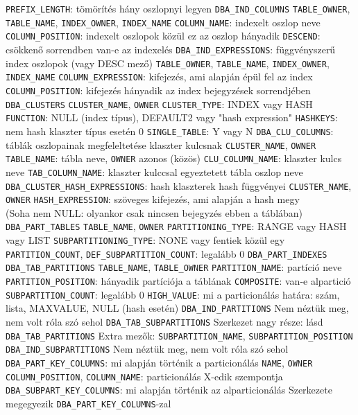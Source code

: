 \documentclass[12pt,a4paper]{article}
\begin{document}
\begin{outline}
		\2 \texttt{PREFIX\_LENGTH}: tömörítés hány oszlopnyi legyen
	\1 \texttt{DBA\_IND\_COLUMNS}
		\2 \texttt{TABLE\_OWNER}, \texttt{TABLE\_NAME}, \texttt{INDEX\_OWNER}, \texttt{INDEX\_NAME}
		\2 \texttt{COLUMN\_NAME}: indexelt oszlop neve
		\2 \texttt{COLUMN\_POSITION}: indexelt oszlopok közül ez az oszlop hányadik
		\2 \texttt{DESCEND}: csökkenő sorrendben van-e az indexelés
	\1 \texttt{DBA\_IND\_EXPRESSIONS}: függvényszerű index oszlopok (vagy DESC mező)
		\2 \texttt{TABLE\_OWNER}, \texttt{TABLE\_NAME}, \texttt{INDEX\_OWNER}, \texttt{INDEX\_NAME}
		\2 \texttt{COLUMN\_EXPRESSION}: kifejezés, ami alapján épül fel az index
		\2 \texttt{COLUMN\_POSITION}: kifejezés hányadik az index bejegyzések sorrendjében
\pagebreak
	\1 \texttt{DBA\_CLUSTERS}
		\2 \texttt{CLUSTER\_NAME}, \texttt{OWNER}
		\2 \texttt{CLUSTER\_TYPE}: INDEX vagy HASH
		\2 \texttt{FUNCTION}: NULL (index típus), DEFAULT2 vagy "hash expression"
		\2 \texttt{HASHKEYS}: nem hash klaszter típus esetén 0
		\2 \texttt{SINGLE\_TABLE}: Y vagy N
	\1 \texttt{DBA\_CLU\_COLUMNS}: táblák oszlopainak megfeleltetése klaszter kulcsnak
		\2 \texttt{CLUSTER\_NAME}, \texttt{OWNER}
		\2 \texttt{TABLE\_NAME}: tábla neve, \texttt{OWNER} azonos (közös)
		\2 \texttt{CLU\_COLUMN\_NAME}: klaszter kulcs neve
		\2 \texttt{TAB\_COLUMN\_NAME}: klaszter kulccsal egyeztetett tábla oszlop neve
	\1 \texttt{DBA\_CLUSTER\_HASH\_EXPRESSIONS}: hash klaszterek hash függvényei
		\2 \texttt{CLUSTER\_NAME}, \texttt{OWNER}
		\2 \texttt{HASH\_EXPRESSION}: szöveges kifejezés, ami alapján a hash megy\\
		(Soha nem NULL: olyankor csak nincsen bejegyzés ebben a táblában)
\pagebreak
	\1 \texttt{DBA\_PART\_TABLES}
		\2 \texttt{TABLE\_NAME}, \texttt{OWNER}
		\2 \texttt{PARTITIONING\_TYPE}: RANGE vagy HASH vagy LIST
		\2 \texttt{SUBPARTITIONING\_TYPE}: NONE vagy fentiek közül egy
		\2 \texttt{PARTITION\_COUNT}, \texttt{DEF\_SUBPARTITION\_COUNT}: legalább 0
	\1 \texttt{DBA\_PART\_INDEXES}
	\1 \texttt{DBA\_TAB\_PARTITIONS}
		\2 \texttt{TABLE\_NAME}, \texttt{TABLE\_OWNER}
		\2 \texttt{PARTITION\_NAME}: partíció neve
		\2 \texttt{PARTITION\_POSITION}: hányadik partíciója a táblának
		\2 \texttt{COMPOSITE}: van-e alpartició
		\2 \texttt{SUBPARTITION\_COUNT}: legalább 0
		\2 \texttt{HIGH\_VALUE}: mi a particionálás határa: szám, lista, MAXVALUE, NULL (hash esetén)
	\1 \texttt{DBA\_IND\_PARTITIONS}
		\2 Nem néztük meg, nem volt róla szó sehol
	\1 \texttt{DBA\_TAB\_SUBPARTITIONS}
		\2 Szerkezet nagy része: lásd \texttt{DBA\_TAB\_PARTITIONS}
		\2 Extra mezők: \texttt{SUBPARTITION\_NAME}, \texttt{SUBPARTITION\_POSITION}
	\1 \texttt{DBA\_IND\_SUBPARTITIONS}
		\2 Nem néztük meg, nem volt róla szó sehol
	\1 \texttt{DBA\_PART\_KEY\_COLUMNS}: mi alapján történik a particionálás
		\2 \texttt{NAME}, \texttt{OWNER}
		\2 \texttt{COLUMN\_POSITION}, \texttt{COLUMN\_NAME}: particionálás X-edik szempontja
	\1 \texttt{DBA\_SUBPART\_KEY\_COLUMNS}: mi alapján történik az alparticionálás
		\2 Szerkezete megegyezik \texttt{DBA\_PART\_KEY\_COLUMNS}-zal
\end{outline}
\end{document}
